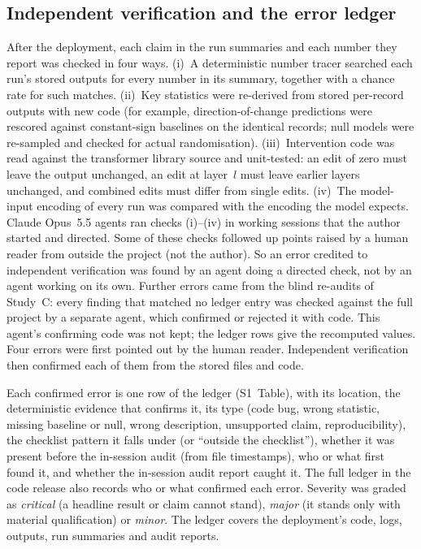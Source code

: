 \documentclass[10pt,letterpaper]{article}
\begin{document}
\subsection*{Independent verification and the error ledger}
After the deployment, each claim in the run summaries and each number
they report was checked in four ways. (i)~A deterministic number tracer
searched each run's stored outputs for every number in its summary,
together with a chance rate for such matches. (ii)~Key statistics were
re-derived from stored per-record outputs with new code (for example,
direction-of-change predictions were rescored against constant-sign
baselines on the identical records; null models were re-sampled and
checked for actual randomisation). (iii)~Intervention code was read
against the transformer library source and unit-tested: an edit of zero
must leave the output unchanged, an edit at layer~$l$ must leave earlier
layers unchanged, and combined edits must differ from single edits.
(iv)~The model-input encoding of every run was compared with the
encoding the model expects. Claude Opus~5.5 agents ran checks (i)--(iv)
in working sessions that the author started and directed. Some of these
checks followed up points raised by a human reader from outside the
project (not the author). So an error credited to independent verification was found
by an agent doing a directed check, not by an agent working on its own.
Further errors came from the blind re-audits
of Study~C: every finding that matched no ledger entry was checked against
the full project by a separate agent, which confirmed or rejected it with
code. This agent's confirming code was not kept; the ledger rows give
the recomputed values. Four errors were first pointed out by the human reader.
Independent verification then confirmed each of them from the stored
files and code.

Each confirmed error is one row of the ledger (S1~Table), with its
location, the deterministic evidence that confirms it, its type (code
bug, wrong statistic, missing baseline or null, wrong description,
unsupported claim, reproducibility), the checklist pattern it falls
under (or ``outside the checklist''), whether it was present before the
in-session audit (from file timestamps), who or what first found it, and
whether the in-session audit report caught it. The full ledger in the code
release also records who or what confirmed each error. Severity was graded as \emph{critical} (a headline result or claim cannot
stand), \emph{major} (it stands only with material qualification) or
\emph{minor}. The ledger covers the deployment's code, logs, outputs, run
summaries and audit reports.
\end{document}
